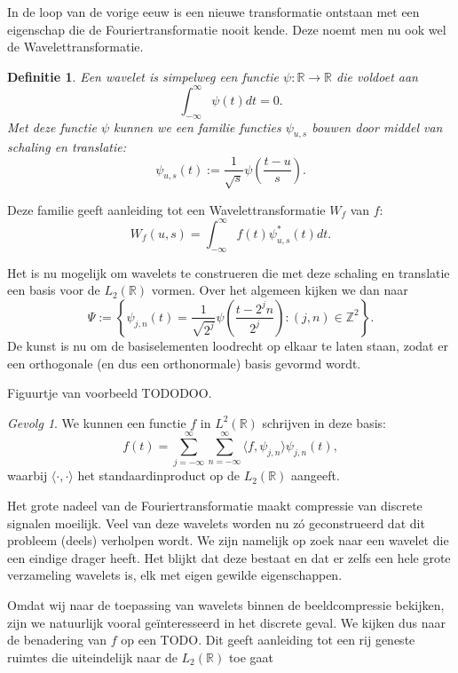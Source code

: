 \documentclass[11pt]{report}
\newcommand{\R}{\mathbb{R}}
\newcommand{\Z}{\mathbb{Z}}
\theoremstyle{plain}
\newtheorem*{definitie}{Definitie}
\theoremstyle{remark}
\newtheorem*{gevolg}{Gevolg}
\begin{document}
In de loop van de vorige eeuw is een nieuwe transformatie ontstaan met een eigenschap die de Fouriertransformatie nooit kende. Deze noemt men nu ook wel de Wavelettransformatie.

\begin{definitie}
Een wavelet is simpelweg een functie $\psi: \R \to \R$ die voldoet aan
\[
  \int_{-\infty}^{\infty} \psi(t) dt = 0.
\]
Met deze functie $\psi$ kunnen we een familie functies $\psi_{u,s}$ bouwen door middel van schaling en translatie:
\[
  \psi_{u,s}(t) := \frac{1}{\sqrt{s}} \psi\left(\frac{t-u}{s}\right).
\]
\end{definitie}

Deze familie geeft aanleiding tot een Wavelettransformatie $W_f$ van $f$:
\[
  W_f(u,s) = \int_{-\infty}^\infty f(t) \psi^*_{u,s}(t) dt.
\]

Het is nu mogelijk om wavelets te construeren die met deze schaling en translatie een basis voor de $L_2(\R)$ vormen. Over het algemeen kijken we dan naar
\[
  \Psi := \left\{ \psi_{j,n}(t) = \frac{1}{\sqrt{2^j}} \psi\left( \frac{t - 2^jn}{2^j}\right) : (j,n) \in \Z^2 \right\}.
\]
De kunst is nu om de basiselementen loodrecht op elkaar te laten staan, zodat er een orthogonale (en dus een orthonormale) basis gevormd wordt. 

Figuurtje van voorbeeld TODODOO.

\begin{gevolg}We kunnen een functie $f$ in $L^2(\R)$ schrijven in deze basis:
\[
  f(t) = \sum_{j=-\infty}^{\infty} \sum_{n=-\infty}^{\infty} \langle f, \psi_{j,n} \rangle \psi_{j,n}(t),
\]
waarbij $\langle \cdot, \cdot \rangle$ het standaardinproduct op de $L_2(\R)$ aangeeft.
\end{gevolg}

Het grote nadeel van de Fouriertransformatie maakt compressie van discrete signalen moeilijk. Veel van deze wavelets worden nu z\'o geconstrueerd dat dit probleem (deels) verholpen wordt. We zijn namelijk op zoek naar een wavelet die een eindige drager heeft. Het blijkt dat deze bestaat en dat er zelfs een hele grote verzameling wavelets is, elk met eigen gewilde eigenschappen.

Omdat wij naar de toepassing van wavelets binnen de beeldcompressie bekijken, zijn we natuurlijk vooral ge\"interesseerd in het discrete geval. We kijken dus naar de benadering van $f$ op een TODO. Dit geeft aanleiding tot een rij geneste ruimtes die uiteindelijk naar de $L_2(\R)$ toe gaat
\end{document}
